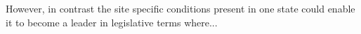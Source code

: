 
However, in contrast the site specific conditions present in one state
could enable it to become a leader in legislative terms where...






